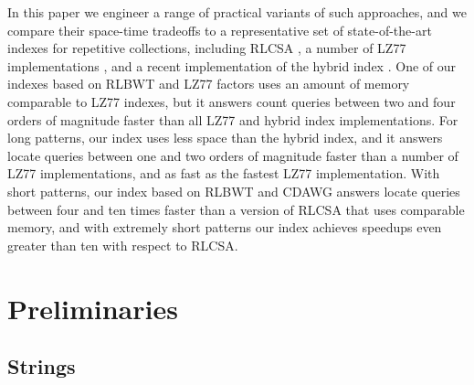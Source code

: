 \documentclass[a4paper,UKenglish]{lipics-v2016}
\begin{document}
In this paper we engineer a range of practical variants of such approaches, and we compare their space-time tradeoffs to a representative set of state-of-the-art indexes for repetitive collections, including RLCSA \cite{MakinenNSV10}, a number of LZ77 implementations \cite{kreft2010self}, and a recent implementation of the hybrid index \cite{valenzuela2016chico}. One of our indexes based on RLBWT and LZ77 factors uses an amount of memory comparable to LZ77 indexes, but it answers count queries between two and four orders of magnitude faster than all LZ77 and hybrid index implementations. For long patterns, our index uses less space than the hybrid index, and it answers locate queries between one and two orders of magnitude faster than a number of LZ77 implementations, and as fast as the fastest LZ77 implementation. With short patterns, our index based on RLBWT and CDAWG answers locate queries between four and ten times faster than a version of RLCSA that uses comparable memory, and with extremely short patterns our index achieves speedups even greater than ten with respect to RLCSA.









































\section{Preliminaries}

\subsection{Strings} \label{sec:strings}
\end{document}
